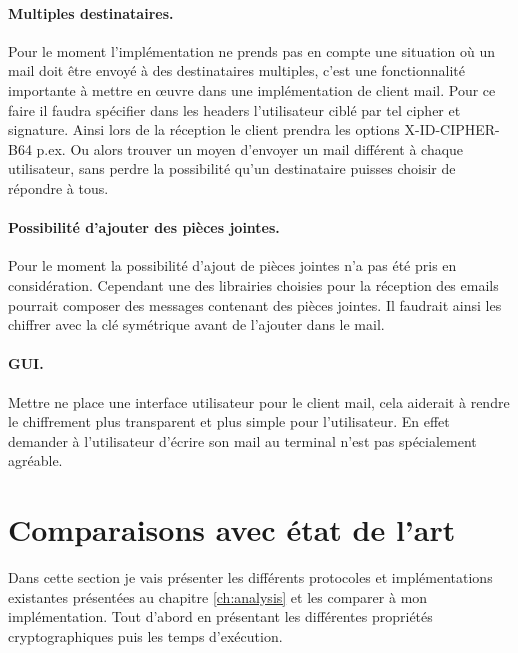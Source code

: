 \paragraph*{Multiples destinataires.}
Pour le moment l'implémentation ne prends pas en compte une situation où un mail doit être envoyé à des destinataires multiples, c'est une fonctionnalité importante à mettre en œuvre dans une implémentation de client mail. Pour ce faire il faudra spécifier dans les headers l'utilisateur ciblé par tel cipher et signature. Ainsi lors de la réception le client prendra les options X-ID-CIPHER-B64 p.ex. Ou alors trouver un moyen d'envoyer un mail différent à chaque utilisateur, sans perdre la possibilité qu'un destinataire puisses choisir de répondre à tous.
\paragraph*{Possibilité d'ajouter des pièces jointes.}
Pour le moment la possibilité d'ajout de pièces jointes n'a pas été pris en considération. Cependant une des librairies choisies pour la réception des emails pourrait composer des messages contenant des pièces jointes. Il faudrait ainsi les chiffrer avec la clé symétrique avant de l'ajouter dans le mail.
\paragraph*{GUI.}
Mettre ne place une interface utilisateur pour le client mail, cela aiderait à rendre le chiffrement plus transparent et plus simple pour l'utilisateur. En effet demander à l'utilisateur d'écrire son mail au terminal n'est pas spécialement agréable.
\section{Comparaisons avec état de l'art}
Dans cette section je vais présenter les différents protocoles et implémentations existantes présentées au chapitre \ref{ch:analysis} et les comparer à mon implémentation. Tout d'abord en présentant les différentes propriétés cryptographiques puis les temps d'exécution.

